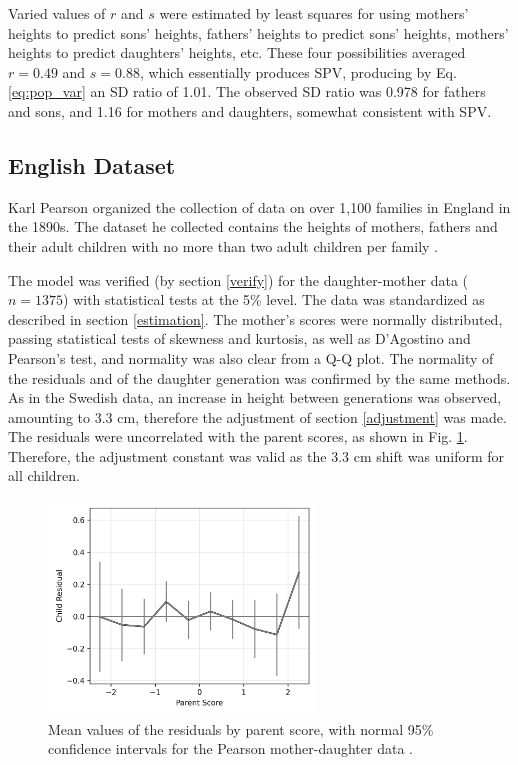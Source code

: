\documentclass{svproc} %
\begin{document}
Varied values of $r$ and $s$ were estimated by least squares for using mothers' heights to predict sons' heights, fathers' heights to predict sons' heights, mothers' heights to predict daughters' heights, etc. These four possibilities averaged $r = 0.49$ and $s = 0.88$, which essentially produces SPV, producing by Eq. \ref{eq:pop_var} an SD ratio of 1.01. The observed SD ratio was 0.978 for fathers and sons, and 1.16 for mothers and daughters, somewhat consistent with SPV. 


\subsection{English Dataset} \label{pearson}

Karl Pearson organized the collection of data on over 1,100 families in England in the 1890s. The dataset he collected contains the heights of mothers, fathers and their adult children with no more than two adult children per family \cite{pearson}. 

The model was verified (by section \ref{verify}) for the daughter-mother data ($n = 1375$) with statistical tests at the 5\% level. The data was standardized as described in section \ref{estimation}. The mother's scores were normally distributed, passing statistical tests of skewness and kurtosis, as well as D’Agostino and Pearson's test, and normality was also clear from a Q-Q plot. The normality of the residuals and of the daughter generation was confirmed by the same methods. As in the Swedish data, an increase in height between generations was observed, amounting to 3.3 cm, therefore the adjustment of section \ref{adjustment} was made. The residuals were uncorrelated with the parent scores, as shown in Fig. \ref{fig:pearson_residuals_by_score}. Therefore, the adjustment constant was valid as the 3.3 cm shift was uniform for all children. 

\begin{figure}[h]
\includegraphics[width=2.8in]{figures/pearson-lee-mother-daughter-residuals_by_parent.png}
\centering
\caption{Mean values of the residuals by parent score, with normal 95\% confidence intervals for the Pearson mother-daughter data \cite{pearson}.}
\label{fig:pearson_residuals_by_score}
\end{figure}
\end{document}
